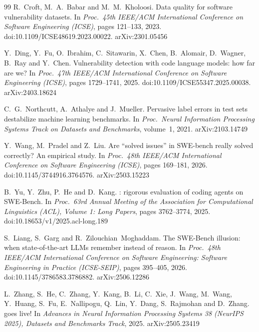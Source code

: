 \documentclass[11pt,a4paper]{article}
\begin{document}
\begin{thebibliography}{99}
R.~Croft, M.~A.~Babar and M.~M.~Kholoosi.
\newblock Data quality for software vulnerability datasets.
\newblock In \emph{Proc.\ 45th IEEE/ACM International Conference on Software
Engineering (ICSE)}, pages 121--133, 2023.
\newblock doi:10.1109/ICSE48619.2023.00022. arXiv:2301.05456

Y.~Ding, Y.~Fu, O.~Ibrahim, C.~Sitawarin, X.~Chen, B.~Alomair, D.~Wagner,
B.~Ray and Y.~Chen.
\newblock Vulnerability detection with code language models: how far are we?
\newblock In \emph{Proc.\ 47th IEEE/ACM International Conference on Software
Engineering (ICSE)}, pages 1729--1741, 2025.
\newblock doi:10.1109/ICSE55347.2025.00038. arXiv:2403.18624

C.~G.~Northcutt, A.~Athalye and J.~Mueller.
\newblock Pervasive label errors in test sets destabilize machine learning
benchmarks.
\newblock In \emph{Proc.\ Neural Information Processing Systems Track on
Datasets and Benchmarks}, volume~1, 2021.
\newblock arXiv:2103.14749

Y.~Wang, M.~Pradel and Z.~Liu.
\newblock Are ``solved issues'' in {SWE-bench} really solved correctly? {A}n
empirical study.
\newblock In \emph{Proc.\ 48th IEEE/ACM International Conference on Software
Engineering (ICSE)}, pages 169--181, 2026.
\newblock doi:10.1145/3744916.3764576. arXiv:2503.15223

B.~Yu, Y.~Zhu, P.~He and D.~Kang.
: rigorous evaluation of coding agents on {SWE-Bench}.
\newblock In \emph{Proc.\ 63rd Annual Meeting of the Association for
Computational Linguistics (ACL), Volume 1: Long Papers}, pages 3762--3774,
2025.
\newblock doi:10.18653/v1/2025.acl-long.189

S.~Liang, S.~Garg and R.~Zilouchian~Moghaddam.
\newblock The {SWE-Bench} illusion: when state-of-the-art {LLMs} remember
instead of reason.
\newblock In \emph{Proc.\ 48th IEEE/ACM International Conference on Software
Engineering: Software Engineering in Practice (ICSE-SEIP)}, pages 395--405,
2026.
\newblock doi:10.1145/3786583.3786882. arXiv:2506.12286

L.~Zhang, S.~He, C.~Zhang, Y.~Kang, B.~Li, C.~Xie, J.~Wang, M.~Wang,
Y.~Huang, S.~Fu, E.~Nallipogu, Q.~Lin, Y.~Dang, S.~Rajmohan and D.~Zhang.
 goes live!
\newblock In \emph{Advances in Neural Information Processing Systems 38
(NeurIPS 2025), Datasets and Benchmarks Track}, 2025.
\newblock arXiv:2505.23419


\end{thebibliography}
\end{document}
